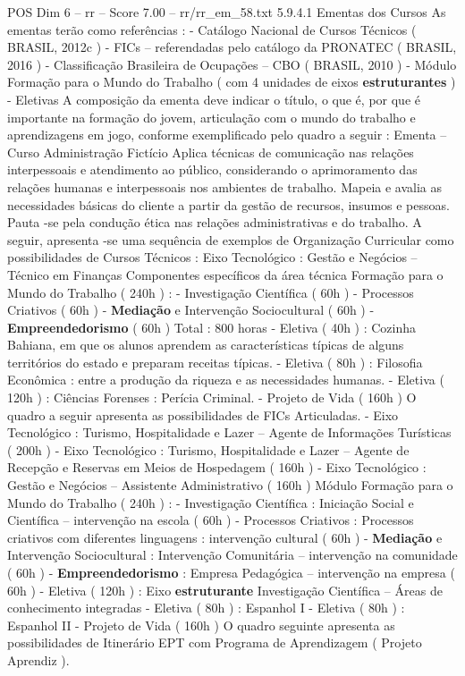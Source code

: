 \begin{textsample}{POS Dim 6 – rr – Score 7.00 – rr/rr\_em\_58.txt}  \label{ex:f6_pos_215}
5.9.4.1 Ementas dos Cursos As ementas terão como referências : - Catálogo Nacional de Cursos Técnicos ( BRASIL, 2012c ) - FICs – referendadas pelo catálogo da PRONATEC ( BRASIL, 2016 ) - Classificação Brasileira de Ocupações – CBO ( BRASIL, 2010 ) - Módulo Formação para o Mundo do Trabalho ( com 4 unidades de eixos \textbf{estruturantes} ) - Eletivas A composição da ementa deve indicar o título, o que é, por que é importante na formação do jovem, articulação com o mundo do trabalho e aprendizagens em jogo, conforme exemplificado pelo quadro a seguir : Ementa – Curso Administração Fictício Aplica técnicas de comunicação nas relações interpessoais e atendimento ao público, considerando o aprimoramento das relações humanas e interpessoais nos ambientes de trabalho.
Mapeia e avalia as necessidades básicas do cliente a partir da gestão de recursos, insumos e pessoas.
Pauta -se pela condução ética nas relações administrativas e do trabalho.
A seguir, apresenta -se uma sequência de exemplos de Organização Curricular como possibilidades de Cursos Técnicos : Eixo Tecnológico : Gestão e Negócios – Técnico em Finanças Componentes específicos da área técnica Formação para o Mundo do Trabalho ( 240h ) : - Investigação Científica ( 60h ) - Processos Criativos ( 60h ) - \textbf{Mediação} e Intervenção Sociocultural ( 60h ) - \textbf{Empreendedorismo} ( 60h ) Total : 800 horas - Eletiva ( 40h ) : Cozinha Bahiana, em que os alunos aprendem as características típicas de alguns territórios do estado e preparam receitas típicas. - Eletiva ( 80h ) : Filosofia Econômica : entre a produção da riqueza e as necessidades humanas. - Eletiva ( 120h ) : Ciências Forenses : Perícia Criminal. - Projeto de Vida ( 160h ) O quadro a seguir apresenta as possibilidades de FICs Articuladas. - Eixo Tecnológico : Turismo, Hospitalidade e Lazer – Agente de Informações Turísticas ( 200h ) - Eixo Tecnológico : Turismo, Hospitalidade e Lazer – Agente de Recepção e Reservas em Meios de Hospedagem ( 160h ) - Eixo Tecnológico : Gestão e Negócios – Assistente Administrativo ( 160h ) Módulo Formação para o Mundo do Trabalho ( 240h ) : - Investigação Científica : Iniciação Social e Científica – intervenção na escola ( 60h ) - Processos Criativos : Processos criativos com diferentes linguagens : intervenção cultural ( 60h ) - \textbf{Mediação} e Intervenção Sociocultural : Intervenção Comunitária – intervenção na comunidade ( 60h ) - \textbf{Empreendedorismo} : Empresa Pedagógica – intervenção na empresa ( 60h ) - Eletiva ( 120h ) : Eixo \textbf{estruturante} Investigação Científica – Áreas de conhecimento integradas - Eletiva ( 80h ) : Espanhol I - Eletiva ( 80h ) : Espanhol II - Projeto de Vida ( 160h ) O quadro seguinte apresenta as possibilidades de Itinerário EPT com Programa de Aprendizagem ( Projeto Aprendiz ).

\end{textsample}
